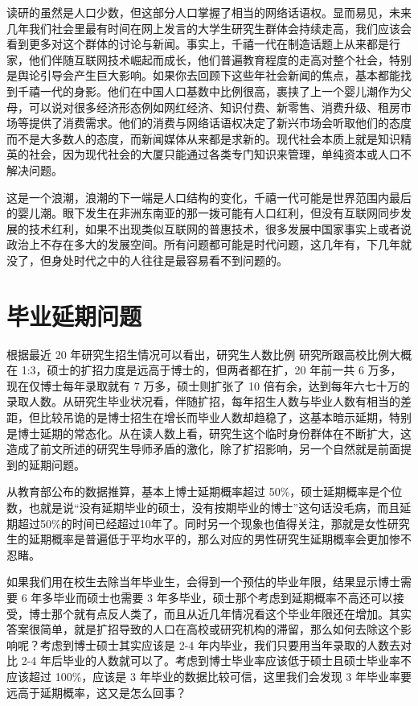 \documentclass[]{tufte-book}
\begin{document}
读研的虽然是人口少数，但这部分人口掌握了相当的网络话语权。显而易见，未来几年我们社会里最有时间在网上发言的大学生研究生群体会持续走高，我们应该会看到更多对这个群体的讨论与新闻。事实上，千禧一代在制造话题上从来都是行家，他们伴随互联网技术崛起而成长，他们普遍教育程度的走高对整个社会，特别是舆论引导会产生巨大影响。如果你去回顾下这些年社会新闻的焦点，基本都能找到千禧一代的身影。他们在中国人口基数中比例很高，裹挟了上一个婴儿潮作为父母，可以说对很多经济形态例如网红经济、知识付费、新零售、消费升级、租房市场等提供了消费需求。他们的消费与网络话语权决定了新兴市场会听取他们的态度而不是大多数人的态度，而新闻媒体从来都是求新的。现代社会本质上就是知识精英的社会，因为现代社会的大厦只能通过各类专门知识来管理，单纯资本或人口不解决问题。

这是一个浪潮，浪潮的下一端是人口结构的变化，千禧一代可能是世界范围内最后的婴儿潮。眼下发生在非洲东南亚的那一拨可能有人口红利，但没有互联网同步发展的技术红利，如果不出现类似互联网的普惠技术，很多发展中国家事实上或者说政治上不存在多大的发展空间。所有问题都可能是时代问题，这几年有，下几年就没了，但身处时代之中的人往往是最容易看不到问题的。

\hypertarget{ux6bd5ux4e1aux5ef6ux671fux95eeux9898}{%
\section{毕业延期问题}\label{ux6bd5ux4e1aux5ef6ux671fux95eeux9898}}

根据最近 20 年研究生招生情况可以看出，研究生人数比例 研究所跟高校比例大概在 1:3，硕士的扩招力度是远高于博士的，但两者都在扩，20 年前一共 6 万多，现在仅博士每年录取就有 7 万多，硕士则扩张了 10 倍有余，达到每年六七十万的录取人数。从研究生毕业状况看，伴随扩招，每年招生人数与毕业人数有相当的差距，但比较吊诡的是博士招生在增长而毕业人数却趋稳了，这基本暗示延期，特别是博士延期的常态化。从在读人数上看，研究生这个临时身份群体在不断扩大，这造成了前文所述的研究生导师矛盾的激化，除了扩招影响，另一个自然就是前面提到的延期问题。

从教育部公布的数据推算，基本上博士延期概率超过 50\%，硕士延期概率是个位数，也就是说``没有延期毕业的硕士，没有按期毕业的博士''这句话没毛病，而且延期超过50\%的时间已经超过10年了。同时另一个现象也值得关注，那就是女性研究生的延期概率是普遍低于平均水平的，那么对应的男性研究生延期概率会更加惨不忍睹。

如果我们用在校生去除当年毕业生，会得到一个预估的毕业年限，结果显示博士需要 6 年多毕业而硕士也需要 3 年多毕业，硕士那个考虑到延期概率不高还可以接受，博士那个就有点反人类了，而且从近几年情况看这个毕业年限还在增加。其实答案很简单，就是扩招导致的人口在高校或研究机构的滞留，那么如何去除这个影响呢？考虑到博士硕士其实应该是 2-4 年内毕业，我们只要用当年录取的人数去对比 2-4 年后毕业的人数就可以了。考虑到博士毕业率应该低于硕士且硕士毕业率不应该超过 100\%，应该是 3 年毕业的数据比较可信，这里我们会发现 3 年毕业率要远高于延期概率，这又是怎么回事？
\end{document}
